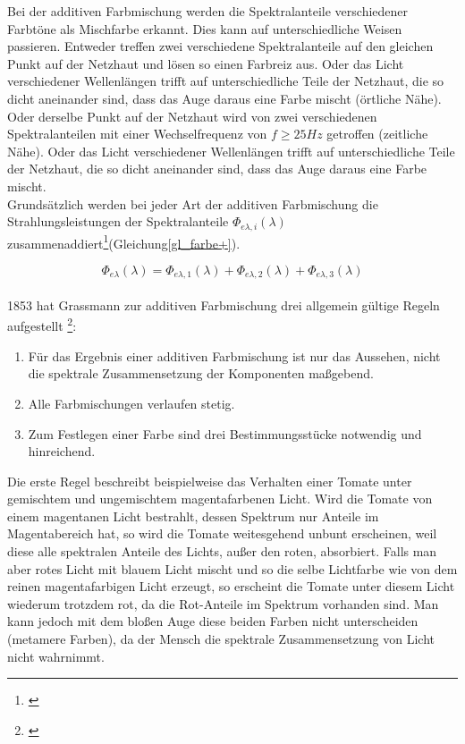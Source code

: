 
Bei der additiven Farbmischung werden die Spektralanteile verschiedener Farbtöne als Mischfarbe erkannt. Dies kann auf unterschiedliche Weisen passieren. Entweder treffen zwei verschiedene Spektralanteile auf den gleichen Punkt auf der Netzhaut und lösen so einen Farbreiz aus. Oder das Licht verschiedener Wellenlängen trifft auf unterschiedliche Teile der Netzhaut, die so dicht aneinander sind, dass das Auge daraus eine Farbe mischt (örtliche Nähe). Oder derselbe Punkt auf der Netzhaut wird von zwei verschiedenen Spektralanteilen mit einer Wechselfrequenz von $f\geq25Hz$ getroffen (zeitliche Nähe). Oder das Licht verschiedener Wellenlängen trifft auf unterschiedliche Teile der Netzhaut, die so dicht aneinander sind, dass das Auge daraus eine Farbe mischt.\\
Grundsätzlich werden bei jeder Art der additiven Farbmischung die Strahlungsleistungen der Spektralanteile $\Phi_{e\lambda,i}(\lambda)$ zusammenaddiert\footnote{\cite[83]{greule}}(Gleichung\ref{gl_farbe+}).

	\begin{equation}\label{gl_farbe+}
		\Phi_{e\lambda}(\lambda) = \Phi_{e\lambda,1}(\lambda) + \Phi_{e\lambda,2}(\lambda) + \Phi_{e\lambda,3}(\lambda)
	\end{equation}\\


1853 hat Grassmann zur additiven Farbmischung drei allgemein gültige Regeln aufgestellt \footnote{\cite[105]{hentschel}}: 
\newpage
\begin{enumerate}\setlength{\itemsep}{0ex}
\item Für das Ergebnis einer additiven Farbmischung ist nur das Aussehen, nicht die spektrale Zusammensetzung der Komponenten maßgebend.
\item Alle Farbmischungen verlaufen stetig.
\item Zum Festlegen einer Farbe sind drei Bestimmungsstücke notwendig und hinreichend.
\end{enumerate}

Die erste Regel beschreibt beispielweise das Verhalten einer Tomate unter gemischtem und ungemischtem magentafarbenen Licht. Wird die Tomate von einem magentanen Licht bestrahlt, dessen Spektrum nur Anteile im Magentabereich hat, so wird die Tomate weitesgehend unbunt erscheinen, weil diese alle spektralen Anteile des Lichts, außer den roten, absorbiert. Falls man aber rotes Licht mit blauem Licht mischt und so die selbe Lichtfarbe wie von dem reinen magentafarbigen Licht erzeugt, so erscheint die Tomate unter diesem Licht wiederum trotzdem rot, da die Rot-Anteile im Spektrum vorhanden sind. Man kann jedoch mit dem bloßen Auge diese beiden Farben nicht unterscheiden (metamere Farben), da der Mensch die spektrale Zusammensetzung von Licht nicht wahrnimmt. 

